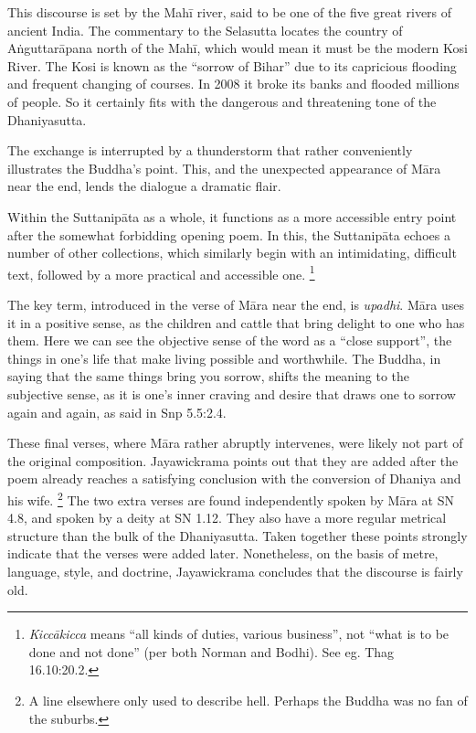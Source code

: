 \documentclass[12pt,openany]{book}%
\begin{document}
This discourse is set by the \textsanskrit{Mahī} river, said to be one of the five great rivers of ancient India. The commentary to the Selasutta locates the country of \textsanskrit{Aṅguttarāpana} north of the \textsanskrit{Mahī}, which would mean it must be the modern Kosi River. The Kosi is known as the “sorrow of Bihar” due to its capricious flooding and frequent changing of courses. In 2008 it broke its banks and flooded millions of people. So it certainly fits with the dangerous and threatening tone of the Dhaniyasutta.

The exchange is interrupted by a thunderstorm that rather conveniently illustrates the Buddha’s point. This, and the unexpected appearance of \textsanskrit{Māra} near the end, lends the dialogue a dramatic flair.

Within the \textsanskrit{Suttanipāta} as a whole, it functions as a more accessible entry point after the somewhat forbidding opening poem. In this, the \textsanskrit{Suttanipāta} echoes a number of other collections, which similarly begin with an intimidating, difficult text, followed by a more practical and accessible one. \footnote{\textit{\textsanskrit{Kiccākicca}} means “all kinds of duties, various business”, not “what is to be done and not done” (per both Norman and Bodhi). See eg. Thag 16.10:20.2. }

The key term, introduced in the verse of \textsanskrit{Māra} near the end, is \textit{upadhi}. \textsanskrit{Māra} uses it in a positive sense, as the children and cattle that bring delight to one who has them. Here we can see the objective sense of the word as a “close support”, the things in one’s life that make living possible and worthwhile. The Buddha, in saying that the same things bring you sorrow, shifts the meaning to the subjective sense, as it is one’s inner craving and desire that draws one to sorrow again and again, as said in Snp 5.5:2.4.

These final verses, where \textsanskrit{Māra} rather abruptly intervenes, were likely not part of the original composition. Jayawickrama points out that they are added after the poem already reaches a satisfying conclusion with the conversion of Dhaniya and his wife. \footnote{A line elsewhere only used to describe hell. Perhaps the Buddha was no fan of the suburbs. } The two extra verses are found independently spoken by \textsanskrit{Māra} at SN 4.8, and spoken by a deity at SN 1.12. They also have a more regular metrical structure than the bulk of the Dhaniyasutta. Taken together these points strongly indicate that the verses were added later. Nonetheless, on the basis of metre, language, style, and doctrine, Jayawickrama concludes that the discourse is fairly old.
\end{document}
